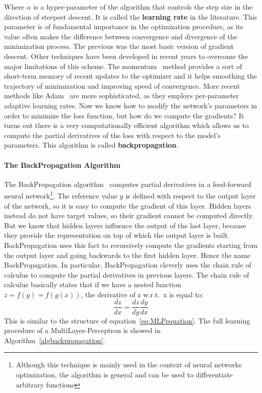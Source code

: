 \documentclass[../main.tex]{subfiles}
\begin{document}
    Where $\alpha$ is a hyper-parameter of the algorithm that controls the step size in the direction of steepest descent. It is called the
    \textbf{learning rate} in the literature. This parameter is of fundamental importance in the optimization procedure, as its value often
    makes the difference between convergence and divergence of the minimization process. The previous was the most basic version of gradient
    descent. Other techniques have been developed in recent years to overcome the major limitations of this scheme. The momentum~\cite{momentum}
    method provides a sort of short-term memory of recent updates to the optimizer and it helps smoothing the trajectory of minimization and
    improving speed of convergence. More recent methods like Adam~\cite{adam} are more sophisticated, as they employs per-parameter
	adaptive learning rates.
	\newline
    Now we know how to modify the network's parameters
    in order to minimize the loss function, but how do we compute the gradients? It turns out there is a very computationally efficient
    algorithm which allows us to compute the partial derivatives of the loss with respect to the model's parameters. This algorithm is called
    \textbf{backpropagation}.

    \paragraph{The BackPropagation Algorithm}
    The BackPropagation algorithm~\cite{backprop} computes partial derivatives in a feed-forward neural network\footnote{Although this
	technique is mainly used in the context of neural networks optimization, the algorithm is general and can be used to differentiate
	arbitrary functions}.
	\newline
	The reference value $y$ is defined with respect to the output layer of the network, so it is easy to compute the gradient of this
	layer. Hidden layers instead do not have target values, so their gradient cannot be computed directly. But we know that hidden layers
	influence the output of the last layer, because they provide the representation on top of which the output layer is built. BackPropagation
	uses this fact to recursively compute the gradients starting from the output layer and going backwards to the first hidden layer. Hence the
	name BackPropagation. In particular, BackPropagation cleverly uses the chain rule of calculus to compute the partial derivatives
	in previous layers. The chain rule of calculus basically states that if we have a nested function
    $ z = f(y) = f(g(x)) $, the derivative of z w.r.t.\ x is equal to:
    $$ \frac{dz}{dx}  = \frac{dz}{dy} \frac{dy}{dx} $$
    This is similar to the structure of equation~\ref{eq:MLPequation}. The full learning procedure of a MultiLayer-Perceptron is showed in Algorithm~\ref{algbackpropagation}.
\end{document}
